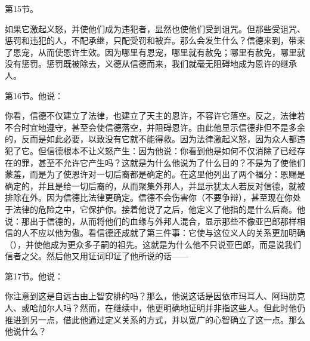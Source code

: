第15节。\par

如果它激起义怒，并使他们成为违犯者，显然也使他们受到诅咒。但那些受诅咒、惩罚和违犯的人，不配承继，只配受罚和被弃。那么会发生什么？信德来到，带来了恩宠，从而使恩许生效。因为哪里有恩宠，哪里就有赦免；哪里有赦免，哪里就没有惩罚。惩罚既被除去，义德从信德而来，我们就毫无阻碍地成为恩许的继承人。\par

第16节。他说：\par

你看，信德不仅建立了法律，也建立了天主的恩许，不容许它落空。反之，法律若不合时宜地遵守，甚至会使信德落空，并阻碍恩许。由此他显示信德非但不是多余的，反而是如此必要，以致没有它就不能得救。因为法律激起义怒，因为众人都违犯了它。但信德根本不让义怒产生：因为他说：你看到他是如何不仅消除了已经存在的罪，甚至不允许它产生吗？这就是为什么他说为了什么目的？不是为了使他们蒙羞，而是为了使恩许对一切后裔都是确定的。在这里他列出了两个福分：恩赐是确定的，并且是给一切后裔的，从而聚集外邦人，并显示犹太人若反对信德，就被排除在外。因为信德比法律更确定。信德不会伤害你（不要争辩），甚至现在你处于法律的危险之中，它保护你。接着他说了之后，他定义了他指的是什么后裔。他说：那出于信德的，从而将他们的血缘与外邦人混合，显示那些不像亚巴郎那样相信的人不应以他为傲。看信德还成就了第三件事：它使与这位义人的关系更加明确（），并使他成为更众多子嗣的祖先。这就是为什么他不只说亚巴郎，而是说我们信者之父。然后他又用证词印证了他所说的话——\par

第17节。他说：\par

你注意到这是自远古由上智安排的吗？那么，他说这话是因依市玛耳人、阿玛肋克人、或哈加尔人吗？然而，在继续中，他更明确地证明并非指这些人。但此时他仍推进到另一点，借此他通过定义关系的方式，并以宽广的心智确立了这一点。那么他说什么？\par

\par

